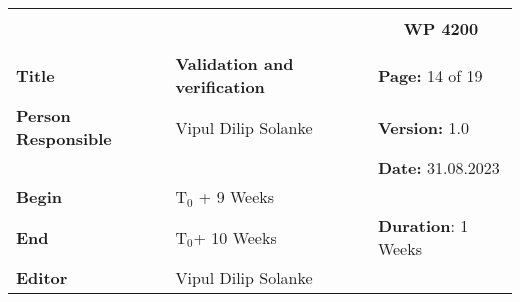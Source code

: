 \begin{table}[!h]
  \begin{center}
    \begin{tabular}{|p{35mm}||p{55mm}|p{50mm}||p{40mm}|}
      \hline
      \multicolumn{3}{|l||}{\textbf{}} & \multicolumn{1}{c|}{}                                                                                                                                                \\
      \multicolumn{3}{|l||}{\textbf{}} & \multicolumn{1}{c|}{\textbf{WP 4200}}                                                                                                                                \\
      \multicolumn{3}{|l||}{\textbf{}} & \multicolumn{1}{c|}{}                                                                                                                                                \\
      \hline\hline
      \textbf{Title}                   & \multicolumn{2}{p{7cm}||}{\textbf{Validation and verification}}
                                       & \textbf{Page:} 14 of 19                                                                                                                                             \\
      \hline
      \textbf{Person Responsible}        & \multicolumn{2}{l||}{Vipul Dilip Solanke}                                                                                                   & \textbf{Version:} 1.0   \\
      \hline
      \multicolumn{3}{|l||}{}          & \textbf{Date:} 31.08.2023                                                                                                                                          \\
      \hline\hline
      \textbf{Begin}                  & \multicolumn{2}{l||}{T$_0$ + 9 Weeks}                                                                                                                &                         \\
      \hline
      \textbf{End}                    & \multicolumn{2}{l||}{T$_0$+ 10 Weeks}                                                                                                        & \textbf{Duration}: 1 Weeks \\
      \hline\hline
      \textbf{Editor}              & \multicolumn{3}{l|}{Vipul Dilip Solanke}                                                                                                                              \\

\end{tabular}
\end{center}
\end{table}
